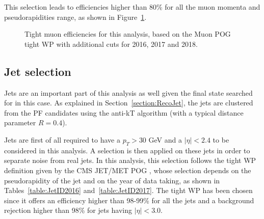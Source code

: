 \documentclass[a4paper, 10pt, openright]{report}
\begin{document}
This selection leads to efficiencies higher than 80\% for all the muon momenta and pseudorapidities range, as shown in Figure~\ref{fig:MuonEff}.

\begin{figure}[htbp]
\centering
{}
\caption{Tight muon efficiencies for this analysis, based on the Muon \ac{POG} tight \ac{WP} with additional cuts for 2016, 2017 and 2018.}
\label{fig:MuonEff}
\end{figure}

\subsection{Jet selection} \label{section:JetSel}

Jets are an important part of this analysis as well given the final state searched for in this case. As explained in Section~\ref{section:RecoJet}, the jets are clustered from the \ac{PF} candidates using the anti-kT algorithm (with a typical distance parameter $R = 0.4$). 

Jets are first of all required to have a $p_T > 30$ GeV and a $|\eta| < 2.4$ to be considered in this analysis. A selection is then applied on these jets in order to separate noise from real jets. In this analysis, this selection follows the tight \ac{WP} definition given by the \ac{CMS} JET/MET \ac{POG} \cite{JETMETPOG}, whose selection depends on the pseudorapidity of the jet and on the year of data taking, as shown in Tables~\ref{table:JetID2016} and~\ref{table:JetID2017}. The tight \ac{WP} has been chosen since it offers an efficiency higher than 98-99\% for all the jets and a background rejection higher than 98\% for jets having $|\eta| < 3.0$.
\end{document}
